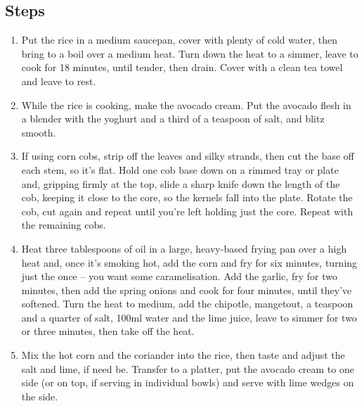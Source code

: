 \documentclass{book}
\begin{document}
\subsection*{Steps}
\begin{enumerate}
\item Put the rice in a medium saucepan, cover with plenty of cold water, then bring to a boil over a medium heat. Turn down the heat to a simmer, leave to cook for 18 minutes, until tender, then drain. Cover with a clean tea towel and leave to rest.
\item While the rice is cooking, make the avocado cream. Put the avocado flesh in a blender with the yoghurt and a third of a teaspoon of salt, and blitz smooth.
\item If using corn cobs, strip off the leaves and silky strands, then cut the base off each stem, so it’s flat. Hold one cob base down on a rimmed tray or plate and, gripping firmly at the top, slide a sharp knife down the length of the cob, keeping it close to the core, so the kernels fall into the plate. Rotate the cob, cut again and repeat until you’re left holding just the core. Repeat with the remaining cobs.
\item Heat three tablespoons of oil in a large, heavy-based frying pan over a high heat and, once it’s smoking hot, add the corn and fry for six minutes, turning just the once – you want some caramelisation. Add the garlic, fry for two minutes, then add the spring onions and cook for four minutes, until they’ve softened. Turn the heat to medium, add the chipotle, mangetout, a teaspoon and a quarter of salt, 100ml water and the lime juice, leave to simmer for two or three minutes, then take off the heat.
\item Mix the hot corn and the coriander into the rice, then taste and adjust the salt and lime, if need be. Transfer to a platter, put the avocado cream to one side (or on top, if serving in individual bowls) and serve with lime wedges on the side.
\end{enumerate}
\newpage
\end{document}
